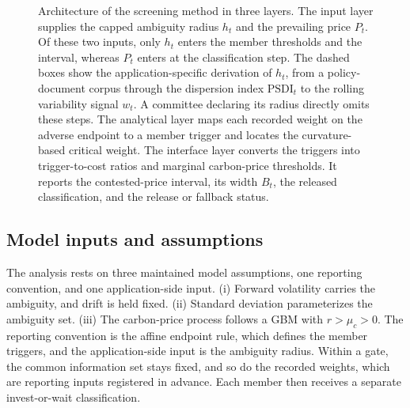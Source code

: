 \documentclass[5p,times,authoryear]{elsarticle}
\theoremstyle{plain}
\newcommand{\PSDI}{\mathrm{PSDI}}
\begin{document}
\begin{figure}[!t]
{}
\caption{Architecture of the screening method in three layers. The input layer supplies the capped ambiguity radius $h_t$ and the prevailing price $P_t$. Of these two inputs, only $h_t$ enters the member thresholds and the interval, whereas $P_t$ enters at the classification step. The dashed boxes show the application-specific derivation of $h_t$, from a policy-document corpus through the dispersion index $\PSDI_t$ to the rolling variability signal $w_t$. A committee declaring its radius directly omits these steps. The analytical layer maps each recorded weight on the adverse endpoint to a member trigger and locates the curvature-based critical weight. The interface layer converts the triggers into trigger-to-cost ratios and marginal carbon-price thresholds. It reports the contested-price interval, its width $B_t$, the released classification, and the release or fallback status.}
\label{fig:architecture}
\end{figure}

\subsection{Model inputs and assumptions}

The analysis rests on three maintained model assumptions, one reporting convention, and one application-side input. (i) Forward volatility carries the ambiguity, and drift is held fixed. (ii) Standard deviation parameterizes the ambiguity set. (iii) The carbon-price process follows a GBM with $r>\mu_c>0$. The reporting convention is the affine endpoint rule, which defines the member triggers, and the application-side input is the ambiguity radius. Within a gate, the common information set stays fixed, and so do the recorded weights, which are reporting inputs registered in advance. Each member then receives a separate invest-or-wait classification.
\end{document}
